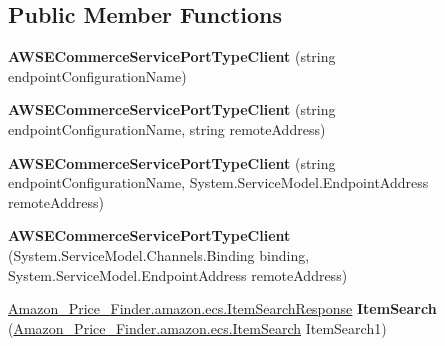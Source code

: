 \subsection*{Public Member Functions}
\begin{DoxyCompactItemize}
\item 
\hypertarget{class_amazon___price___finder_1_1amazon_1_1ecs_1_1_a_w_s_e_commerce_service_port_type_client_aee7d429e245731e87f66325a17228994}{{\bfseries A\-W\-S\-E\-Commerce\-Service\-Port\-Type\-Client} (string endpoint\-Configuration\-Name)}\label{class_amazon___price___finder_1_1amazon_1_1ecs_1_1_a_w_s_e_commerce_service_port_type_client_aee7d429e245731e87f66325a17228994}

\item 
\hypertarget{class_amazon___price___finder_1_1amazon_1_1ecs_1_1_a_w_s_e_commerce_service_port_type_client_a7bec6da9cb14655b045563a88beab25d}{{\bfseries A\-W\-S\-E\-Commerce\-Service\-Port\-Type\-Client} (string endpoint\-Configuration\-Name, string remote\-Address)}\label{class_amazon___price___finder_1_1amazon_1_1ecs_1_1_a_w_s_e_commerce_service_port_type_client_a7bec6da9cb14655b045563a88beab25d}

\item 
\hypertarget{class_amazon___price___finder_1_1amazon_1_1ecs_1_1_a_w_s_e_commerce_service_port_type_client_ae320841ae838dafe515fa9865112c00c}{{\bfseries A\-W\-S\-E\-Commerce\-Service\-Port\-Type\-Client} (string endpoint\-Configuration\-Name, System.\-Service\-Model.\-Endpoint\-Address remote\-Address)}\label{class_amazon___price___finder_1_1amazon_1_1ecs_1_1_a_w_s_e_commerce_service_port_type_client_ae320841ae838dafe515fa9865112c00c}

\item 
\hypertarget{class_amazon___price___finder_1_1amazon_1_1ecs_1_1_a_w_s_e_commerce_service_port_type_client_afc9cb9783056b7c7a381b26bd629511d}{{\bfseries A\-W\-S\-E\-Commerce\-Service\-Port\-Type\-Client} (System.\-Service\-Model.\-Channels.\-Binding binding, System.\-Service\-Model.\-Endpoint\-Address remote\-Address)}\label{class_amazon___price___finder_1_1amazon_1_1ecs_1_1_a_w_s_e_commerce_service_port_type_client_afc9cb9783056b7c7a381b26bd629511d}

\item 
\hypertarget{class_amazon___price___finder_1_1amazon_1_1ecs_1_1_a_w_s_e_commerce_service_port_type_client_afbb39f1f2d73cc7fc388e4295d7a41bb}{\hyperlink{class_amazon___price___finder_1_1amazon_1_1ecs_1_1_item_search_response}{Amazon\-\_\-\-Price\-\_\-\-Finder.\-amazon.\-ecs.\-Item\-Search\-Response} {\bfseries Item\-Search} (\hyperlink{class_amazon___price___finder_1_1amazon_1_1ecs_1_1_item_search}{Amazon\-\_\-\-Price\-\_\-\-Finder.\-amazon.\-ecs.\-Item\-Search} Item\-Search1)}\label{class_amazon___price___finder_1_1amazon_1_1ecs_1_1_a_w_s_e_commerce_service_port_type_client_afbb39f1f2d73cc7fc388e4295d7a41bb}


\end{DoxyCompactItemize}
